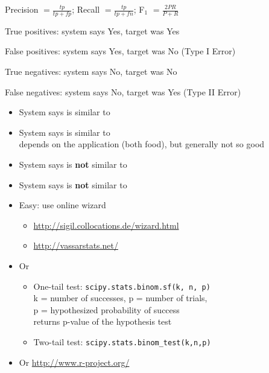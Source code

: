 \documentclass[a4paper,landscape,headrule,footrule,xetex]{foils}
\begin{document}
Precision $=\frac{tp}{tp+fp}$; Recall $=\frac{tp}{tp+fn}$; F$_1$ $=\frac{2PR}{P+R}$


\begin{description} \addtolength{\itemsep}{-1ex}
\item[tp] True positives: system says Yes, target was Yes
\item[fp] False positives: system says Yes, target was No  (Type I Error)
\item[tn] True negatives: system says No, target was No
\item[fn] False negatives: system says No, target was Yes  (Type II Error)
\end{description}


\begin{itemize}
\item System says  is similar to 
  \\  
\item System says  is similar to 
  \\ depends on the application (both food), but generally not so good
  \\ 
\item System says  is \textbf{not} similar to 
  \\ 
\item System says  is \textbf{not} similar to 
  \\ 
\end{itemize}





\begin{itemize}
\item Easy: use online wizard 
  \begin{itemize}
  \item \url{http://sigil.collocations.de/wizard.html}
  \item \url{http://vassarstats.net/}
\end{itemize}
\item Or 
  \begin{itemize}
  \item One-tail test: \texttt{scipy.stats.binom.sf(k, n, p)}
    \\ k = number of successes, p = number of trials, 
    \\ p = hypothesized     probability of success
    \\ returns p-value of the hypothesis test
  \item Two-tail test:  \texttt{scipy.stats.binom\_test(k,n,p)}
  \end{itemize}
\item Or  \url{http://www.r-project.org/}

\end{itemize}
\end{document}
